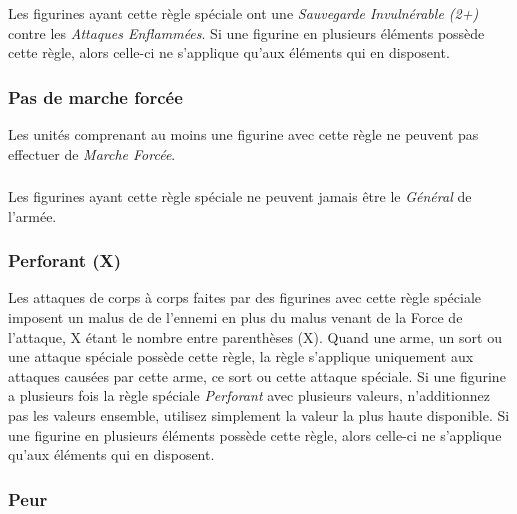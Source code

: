 \subsubsection*{}

Les figurines ayant cette règle spéciale ont une \emph{Sauvegarde Invulnérable (2+)} contre les \emph{Attaques Enflammées}. Si une figurine en plusieurs éléments possède cette règle, alors celle-ci ne s'applique qu'aux éléments qui en disposent.

\subsubsection*{Pas de marche forcée}

Les unités comprenant au moins une figurine avec cette règle ne peuvent pas effectuer de \emph{Marche Forcée}.


\subsubsection*{}

Les figurines ayant cette règle spéciale ne peuvent jamais être le \emph{Général} de l'armée.

\subsubsection*{Perforant (X)}

Les attaques de corps à corps faites par des figurines avec cette règle spéciale imposent un malus de  de l'ennemi en plus du malus venant de la Force de l'attaque, X étant le nombre entre parenthèses (X). Quand une arme, un sort ou une attaque spéciale possède cette règle, la règle s'applique uniquement aux attaques causées par cette arme, ce sort ou cette attaque spéciale. Si une figurine a plusieurs fois la règle spéciale \emph{Perforant} avec plusieurs valeurs, n'additionnez pas les valeurs ensemble, utilisez simplement la valeur la plus haute disponible. Si une figurine en plusieurs éléments possède cette règle, alors celle-ci ne s'applique qu'aux éléments qui en disposent.


\subsubsection*{Peur}

